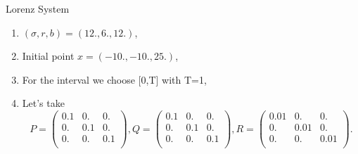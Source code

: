 \documentclass[10pt,xcolor={table,dvipsnames},t]{beamer}
\begin{document}
    \begin{frame}{Lorenz System}
        \begin{enumerate}[\textbullet]
			\item  $(\sigma, r, b)=(12.,6.,12.)$,
			\item Initial point $x=(-10.,-10.,25.)$,
			\item For the interval we choose [0,T] with T=1,
			\item Let's take 
			$$P=\begin{pmatrix}
            0.1 & 0. & 0. \\
            0. & 0.1 & 0. \\
            0. & 0. & 0.1 \\
            \end{pmatrix} ,
            Q=\begin{pmatrix}
            0.1 & 0. & 0. \\
            0. & 0.1 & 0. \\
            0. & 0. & 0.1 \\
            \end{pmatrix},
            R=\begin{pmatrix}
            0.01 & 0. & 0. \\
            0. & 0.01 & 0. \\
            0. & 0. & 0.01 \\
            \end{pmatrix}.$$ 
    	\end{enumerate}
    \end{frame}
    \begin{frame}
    \end{frame}
\end{document}
